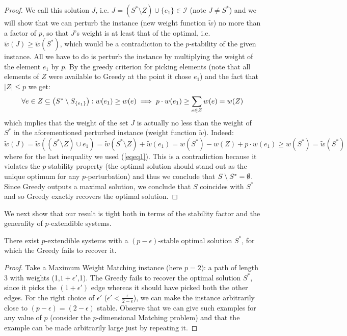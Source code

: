 \begin{proof}
We call this solution $J$, i.e. $J=(S^*\setminus Z)\cup\{e_1\} \in \mathcal{I}$ (note $J\neq S^*$) and we will show that we can perturb the instance (new weight function $\tilde{w}$) no more than a factor of $p$, so that $J$'s weight is at least that of the optimal, i.e. $\tilde{w}(J)\ge \tilde{w}(S^*)$, which would be a contradiction to the $p$-stability of the given instance. All we have to do is perturb the instance by multiplying the weight of the element $e_1$ by $p$. By the greedy criterion for picking elements (note that all elements of $Z$ were available to Greedy at the point it chose $e_1$) and the fact that $|Z|\le p$ we get:
\begin{align} \label{eqeq1}
\forall e \in Z\subseteq \left(S^*\setminus S_{\{e_1\}}\right): w(e_1) \ge w(e) \implies p\cdot w(e_1)\ge \sum_{e\in Z}w(e) = w(Z)
\end{align} which implies that the weight of the set $J$ is actually no less than the weight of $S^*$ in the aforementioned perturbed instance (weight function $\tilde{w}$). Indeed:
\[
\tilde{w}(J)=\tilde{w}(\left(S^*\setminus Z\right) \cup e_1) = \tilde{w}(S^*\setminus Z) + \tilde{w}(e_1) = w(S^*)-w(Z)+p\cdot w(e_1)\ge w(S^*)=\tilde{w}(S^*)
\]
where for the last inequality we used (\ref{eqeq1}). This is a contradiction because it violates the $p$-stability property (the optimal solution should stand out as the unique optimum for any $p$-perturbation) and thus we conclude that $S\setminus S^*=\emptyset$. Since Greedy outputs a maximal solution, we conclude that $S$ coincides with $S^*$ and so Greedy exactly recovers the optimal solution.
\end{proof}

We next show that our result is tight both in terms of the stability factor and the generality of $p$-extendible systems. 

\begin{proposition}
There exist $p$-extendible systems with a $(p-\epsilon)$-stable optimal solution $S^*$, for which the Greedy fails to recover it.
\end{proposition}

\begin{proof}
Take a Maximum Weight Matching instance (here $p=2$): a path of length
3 with weights (1,$1+\epsilon'$,1). The Greedy fails to recover the
optimal solution $S^*$, since it picks the $(1+\epsilon') $ edge
whereas it should have picked both the other edges. For the right
choice of $\epsilon'$ ($\epsilon'<\tfrac{\epsilon}{2-\epsilon}$), we
can make the instance arbitrarily close to $(p-\epsilon)=(2-\epsilon)$
stable.  Observe that we can give such examples for any value of $p$
(consider the $p$-dimensional Matching problem) and that the example
can be made arbitrarily large just by repeating it.  
\end{proof}

